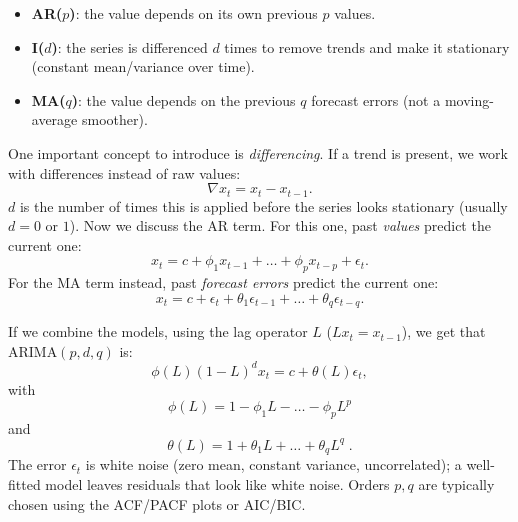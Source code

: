 \documentclass[12pt,a4paper]{article}
\begin{document}
\begin{itemize}
	\item \textbf{AR($p$)}: the value depends on its own previous $p$ values.
	\item \textbf{I($d$)}: the series is differenced $d$ times to remove trends and make it stationary (constant mean/variance over time).
	\item \textbf{MA($q$)}: the value depends on the previous $q$ forecast errors (not a moving-average smoother).
\end{itemize}

One important concept to introduce is \textit{differencing}. If a trend is present, we work with differences instead of raw values:
$$
\nabla x_t = x_t - x_{t-1}.
$$
$d$ is the number of times this is applied before the series looks stationary (usually $d=0$ or $1$).
Now we discuss the AR term. For this one, past \textit{values} predict the current one:
$$
x_t = c + \phi_1 x_{t-1} + \dots + \phi_p x_{t-p} + \epsilon_t.
$$
For the MA term instead, past \textit{forecast errors} predict the current one:
$$
x_t = c + \epsilon_t + \theta_1 \epsilon_{t-1} + \dots + \theta_q \epsilon_{t-q}.
$$

If we combine the models, using the lag operator $L$ ($Lx_t = x_{t-1}$), we get that ARIMA$(p,d,q)$ is:
$$
\phi(L)(1-L)^d x_t = c + \theta(L)\epsilon_t,
$$
with
$$\phi(L) = 1-\phi_1L-\dots-\phi_pL^p$$
and
$$\theta(L) = 1+\theta_1L+\dots+\theta_qL^q\; .$$
The error $\epsilon_t$ is white noise (zero mean, constant variance, uncorrelated); a well-fitted model leaves residuals that look like white noise. Orders $p,q$ are typically chosen using the ACF/PACF plots or AIC/BIC.
\end{document}
